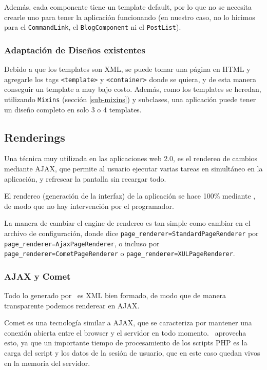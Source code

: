Además, cada componente tiene un template default, por lo que no se necesita crearle uno para tener la aplicación funcionando (en nuestro caso, no lo hicimos para el \verb'CommandLink', el \verb"BlogComponent" ni el \verb"PostList").

\subsubsection{Adaptación de Diseños existentes}
\label{sub-templates-adapt}
Debido a que los templates son XML, se puede tomar una página en HTML y agregarle los tags \verb"<template>" y \verb"<container>" donde se quiera, y de esta manera conseguir un template a muy bajo costo. Además, como los templates se heredan, utilizando \verb"Mixins" (sección \ref{sub-mixins}) y subclases, una aplicación puede tener un diseño completo en solo 3 o 4 templates.

\subsection{Renderings}
\label{sub-render}

Una técnica muy utilizada en las aplicaciones web 2.0, es el rendereo de cambios mediante AJAX, que permite al usuario ejecutar varias tareas en simultáneo en la aplicación, y refrescar la pantalla sin recargar todo.

El rendereo (generación de la interfaz) de la aplicación se hace 100\% mediante \PWB, de modo que no hay intervención por el programador.

La manera de cambiar el engine de rendereo es tan simple como cambiar en el archivo de configuración, donde dice \verb"page_renderer=StandardPageRenderer" por \verb"page_renderer=AjaxPageRenderer", o incluso por \verb"page_renderer=CometPageRenderer" o \verb"page_renderer=XULPageRenderer".

\subsubsection{AJAX y Comet}

Todo lo generado por \PWB \ es XML bien formado, de modo que de manera transparente podemos renderear en AJAX.

Comet es una tecnología similar a AJAX, que se caracteriza por mantener una conexión abierta entre el browser y el servidor en todo momento. \PWB \ aprovecha esto, ya que un importante tiempo de procesamiento de los scripts PHP es la carga del script y los datos de la sesión de usuario, que en este caso quedan vivos en la memoria del servidor.

